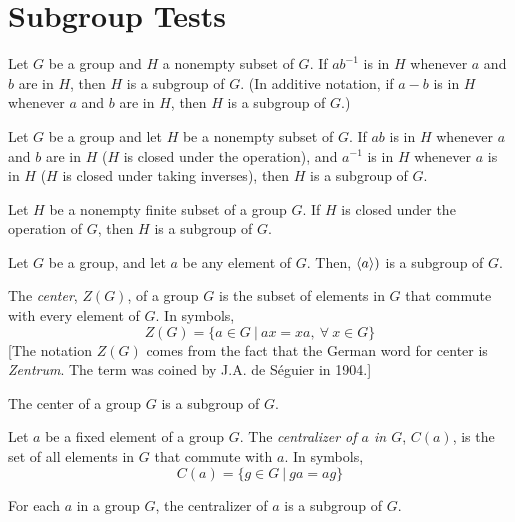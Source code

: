 \section{Subgroup Tests}

\begin{theorem}
	Let $G$ be a group and $H$ a nonempty subset of $G$. If $ab^{-1}$ is in $H$ whenever $a$ and $b$ are in $H$, then $H$ is a subgroup of $G$. (In additive notation, if $a - b$ is in $H$ whenever $a$ and $b$ are in $H$, then $H$ is a subgroup of $G$.)
\end{theorem}

\begin{theorem}
	Let $G$ be a group and let $H$ be a nonempty subset of $G$. If $ab$ is in $H$ whenever $a$ and $b$ are in $H$ ($H$ is closed under the operation), and $a^{-1}$ is in $H$ whenever $a$ is in $H$ ($H$ is closed under taking inverses), then $H$ is a subgroup of $G$.
\end{theorem}

\begin{theorem}
	Let $H$ be a nonempty finite subset of a group $G$. If $H$ is closed under the operation of $G$, then $H$ is a subgroup of $G$.
\end{theorem}

\begin{theorem}
	Let $G$ be a group, and let $a$ be any element of $G$. Then, $\langle a \rangle)$ is a subgroup of $G$.
\end{theorem}

\begin{definition}
	The \textit{center}, $Z(G)$, of a group $G$ is the subset of elements in $G$ that commute with every element of $G$. In symbols,
	\[ Z(G) = \{a \in G\ \vert\ ax = xa,\ \forall\ x \in G\} \]
	[The notation $Z(G)$ comes from the fact that the German word for center is \textit{Zentrum}. The term was coined by J.A. de Séguier in 1904.]
\end{definition}

\begin{theorem}
	The center of a group $G$ is a subgroup of $G$.
\end{theorem}

\begin{definition}
	Let $a$ be a fixed element of a group $G$. The \textit{centralizer of $a$ in $G$}, $C(a)$, is the set of all elements in $G$ that commute with $a$. In symbols,
	\[ C(a) = \{g \in G\ \vert\ ga = ag\} \]
\end{definition}

\begin{theorem}
	For each $a$ in a group $G$, the centralizer of $a$ is a subgroup of $G$.
\end{theorem}
